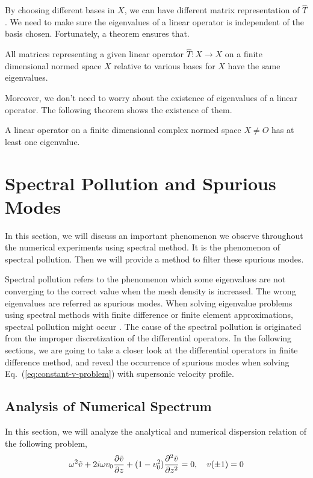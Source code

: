 By choosing different bases in $X$, we can have different matrix representation of $\hat{T}$. We need to make sure the eigenvalues of a linear operator is independent of the basis chosen. Fortunately, a theorem ensures that.

\begin{theorem} 
	All matrices representing a given linear operator $\hat{T}: X \to X$ on a finite dimensional normed space $X$ relative to various bases for $X$ have the same eigenvalues.
\end{theorem}


Moreover, we don't need to worry about the existence of eigenvalues of a linear operator. The following theorem shows the existence of them.
\begin{theorem} 
	A linear operator on a finite dimensional complex normed space $X\neq{O}$ has at least one eigenvalue.
\end{theorem}

\section{Spectral Pollution and Spurious Modes}
In this section, we will discuss an important phenomenon we observe throughout the numerical experiments using spectral method. It is the phenomenon of spectral pollution. Then we will provide a method to filter these spurious modes.

Spectral pollution refers to the phenomenon which some eigenvalues are not converging to the correct value when the mesh density is increased. The wrong eigenvalues are referred as spurious modes. When solving eigenvalue problems using spectral methods with finite difference or finite element approximations, spectral pollution might occur \cite{llobet_spectral_1990}. The cause of the spectral pollution is originated from the improper discretization of the differential operators. In the following sections, we are going to take a closer look at the differential operators in finite difference method, and reveal the occurrence of spurious modes when solving Eq.~(\ref{eq:constant-v-problem}) with supersonic velocity profile.

\subsection{Analysis of Numerical Spectrum} \label{sec:analysis-of-numerical-spectrum}
In this section, we will analyze the analytical and numerical dispersion relation of the following problem,
\[
	\omega^2\tilde{v} + 2i\omega v_0\pdv{\tilde{v}}{z} + (1-v_0^2)\pdv[2]{\tilde{v}}{z} = 0, \quad v(\pm 1) = 0
\]


